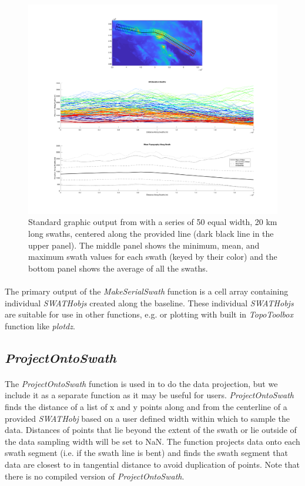 \begin{figure}[H]
	\centering
	\includegraphics[width=14cm]{PNGs/SerialSwath.png}
	\caption{Standard graphic output from  with a series of 50 equal width, 20 km long swaths, centered along the provided line (dark black line in the upper panel). The middle panel shows the minimum, mean, and maximum swath values for each swath (keyed by their color) and the bottom panel shows the average of all the swaths.}
	\label{fig:SerSwath}
\end{figure}

\paragraph{}The primary output of the \textit{MakeSerialSwath} function is a cell array containing individual \textit{SWATHobjs} created along the baseline. These individual \textit{SWATHobjs} are suitable for use in other functions, e.g.  or plotting with built in \textit{TopoToolbox} function like \textit{plotdz}.

\subsection{\textit{ProjectOntoSwath}} \label{sec:ProjSwath}
\paragraph{}The \textit{ProjectOntoSwath} function is used in  to do the data projection, but we include it as a separate function as it may be useful for users. \textit{ProjectOntoSwath} finds the distance of a list of x and y points along and from the centerline of a provided \textit{SWATHobj} based on a user defined width within which to sample the data. Distances of points that lie beyond the extent of the swath or lie outside of the data sampling width will be set to NaN. The function projects data onto each swath segment (i.e. if the swath line is bent) and finds the swath segment that data are closest to in tangential distance to avoid duplication of points. Note that there is no compiled version of \textit{ProjectOntoSwath}.

